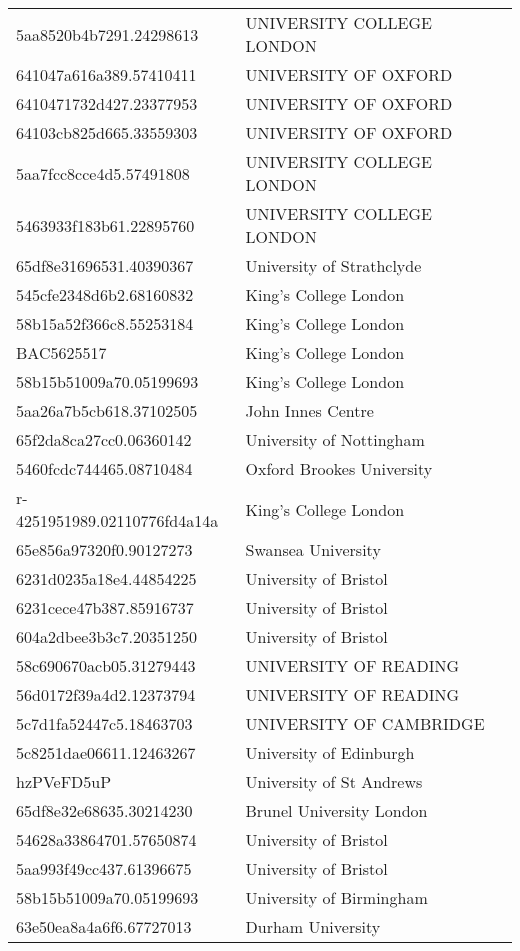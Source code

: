 \begin{tabular}{ll}
5aa8520b4b7291.24298613 & UNIVERSITY COLLEGE LONDON \\
641047a616a389.57410411 & UNIVERSITY OF OXFORD \\
6410471732d427.23377953 & UNIVERSITY OF OXFORD \\
64103cb825d665.33559303 & UNIVERSITY OF OXFORD \\
5aa7fcc8cce4d5.57491808 & UNIVERSITY COLLEGE LONDON \\
5463933f183b61.22895760 & UNIVERSITY COLLEGE LONDON \\
65df8e31696531.40390367 & University of Strathclyde \\
545cfe2348d6b2.68160832 & King's College London \\
58b15a52f366c8.55253184 & King's College London \\
BAC5625517 & King's College London \\
58b15b51009a70.05199693 & King's College London \\
5aa26a7b5cb618.37102505 & John Innes Centre \\
65f2da8ca27cc0.06360142 & University of Nottingham \\
5460fcdc744465.08710484 & Oxford Brookes University \\
r-4251951989.02110776fd4a14a & King's College London \\
65e856a97320f0.90127273 & Swansea University \\
6231d0235a18e4.44854225 & University of Bristol \\
6231cece47b387.85916737 & University of Bristol \\
604a2dbee3b3c7.20351250 & University of Bristol \\
58c690670acb05.31279443 & UNIVERSITY OF READING \\
56d0172f39a4d2.12373794 & UNIVERSITY OF READING \\
5c7d1fa52447c5.18463703 & UNIVERSITY OF CAMBRIDGE \\
5c8251dae06611.12463267 & University of Edinburgh \\
hzPVeFD5uP & University of St Andrews \\
65df8e32e68635.30214230 & Brunel University London \\
54628a33864701.57650874 & University of Bristol \\
5aa993f49cc437.61396675 & University of Bristol \\
58b15b51009a70.05199693 & University of Birmingham \\
63e50ea8a4a6f6.67727013 & Durham University \\

\end{tabular}
